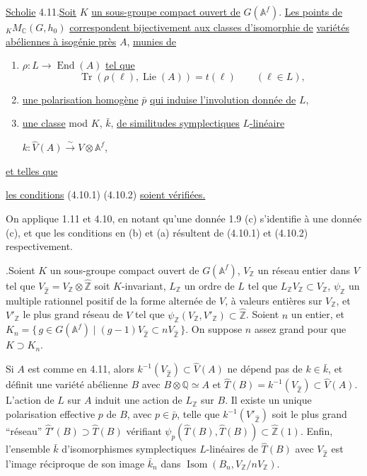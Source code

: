 \documentclass[10pt]{article}
\newcommand{\Af}{\mathbb A^f}
\newcommand{\C}{\mathbb C}
\newcommand{\Q}{\mathbb Q}
\newcommand{\Z}{\mathbb Z}
\newcommand{\Isom}{\operatorname{Isom}}
\newcommand{\Lie}{\operatorname{Lie}}
\newcommand{\End}{\operatorname{End}}
\newcommand{\Tr}{\operatorname{Tr}}
\begin{document}
\noindent \uline{Scholie} 4.11.\quad \uline{Soit} $K$ \uline{un sous-groupe compact ouvert de} $G(\Af)$. \uline{Les points de} ${}_K M_{\C}(G,h_0)$ \uline{correspondent bijectivement aux classes d'isomorphie de} \uline{variétés abéliennes à isogénie près} $A$, \uline{munies de}
\begin{enumerate}[label=(\alph*)]
\item $\rho:L\longrightarrow\End(A)$ \uline{tel que}
\[
\Tr(\rho(\ell),\Lie(A))=t(\ell)\qquad(\ell\in L),
\]
\item \uline{une polarisation homogène} $\bar p$ \uline{qui induise l'involution donnée de} $L$,
\item \uline{une classe} mod $K$, $\bar k$, \uline{de similitudes symplectiques} \uline{$L$-linéaire}

$k:\widehat V(A)\xrightarrow{\sim}V\otimes\Af$,
\end{enumerate}
\uline{et telles que}
\begin{list}{}{\setlength{\leftmargin}{4em}\setlength{\labelwidth}{3em}\setlength{\labelsep}{1em}\setlength{\topsep}{.4em}\setlength{\itemsep}{0pt}}
\item[(*)] \uline{les conditions} (4.10.1) (4.10.2) \uline{soient vérifiées.}
\end{list}
On applique 1.11 et 4.10, en notant qu'une donnée 1.9 (c) s'identifie à une donnée (c), et que les conditions en (b) et (a) résultent de (4.10.1) et (4.10.2) respectivement.

.\quad Soient $K$ un sous-groupe compact ouvert de $G(\Af)$, $V_\Z$ un réseau entier dans $V$ tel que $V_{\widehat{\Z}}=V_\Z\otimes\widehat{\Z}$ soit $K$-invariant, $L_\Z$ un ordre de $L$ tel que $L_\Z V_\Z\subset V_\Z$, $\psi_\Z$ un multiple rationnel positif de la forme alternée de $V$, à valeurs entières sur $V_\Z$, et $V'_\Z$ le plus grand réseau de $V$ tel que $\psi_\Z(V_\Z,V'_\Z)\subset\widehat{\Z}$. Soient $n$ un entier, et $K_n=\{\,g\in G(\Af)\mid (g-1)V_{\widehat{\Z}}\subset nV_{\widehat{\Z}}\,\}$. On suppose $n$ assez grand pour que $K\supset K_n$.

Si $A$ est comme en 4.11, alors $k^{-1}(V_{\widehat{\Z}})\subset\widehat V(A)$ ne dépend pas de $k\in\bar k$, et définit une variété abélienne $B$ avec $B\otimes\Q\simeq A$ et $\widehat T(B)=k^{-1}(V_{\widehat{\Z}})\subset\widehat V(A)$.
L'action de $L$ sur $A$ induit une action de $L_\Z$ sur $B$. Il existe un unique polarisation effective $p$ de $B$, avec $p\in\bar p$, telle que $k^{-1}(V'_{\widehat{\Z}})$ soit le plus grand ``réseau'' $\widehat T'(B)\supset\widehat T(B)$ vérifiant $\psi_p(\widehat T(B),\widehat T(B))\subset\widehat{\Z}(1)$. Enfin, l'ensemble $\bar k$ d'isomorphismes symplectiques $L$-linéaires de $\widehat T(B)$ avec $V_{\widehat{\Z}}$ est l'image réciproque de son image $\bar k_n$ dans $\Isom(B_n,V_\Z/nV_\Z)$.
\end{document}
